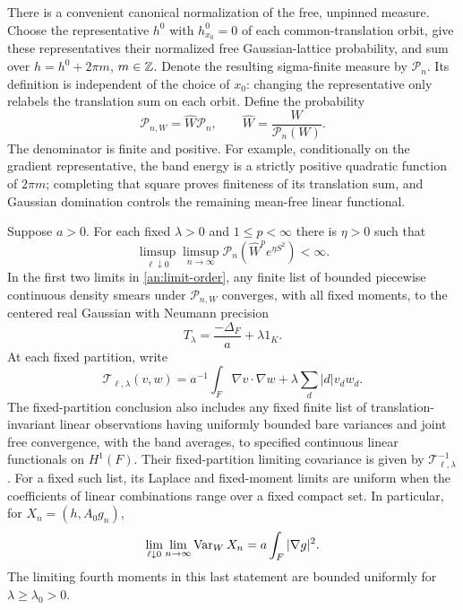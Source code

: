 There is a convenient canonical normalization of the free, unpinned
measure.  Choose the representative $h^0$ with $h^0_{x_0}=0$ of each
common-translation orbit, give these representatives their normalized
free Gaussian-lattice probability, and sum over
$h=h^0+2\pi m$, $m\in\mathbb Z$.  Denote the resulting sigma-finite measure
by $\mathcal P_n$.  Its definition is independent of the choice of
$x_0$: changing the representative only relabels the translation
sum on each orbit.  Define the probability
\begin{equation}
 \mathcal P_{n,W}=\widehat W\mathcal P_n,
 \qquad \widehat W=\frac{W}{\mathcal P_n(W)}.
 \label{an:band-probability}
\end{equation}
The denominator is finite and positive.  For example, conditionally
on the gradient representative, the band energy is a strictly
positive quadratic function of $2\pi m$; completing that square
proves finiteness of its translation sum, and Gaussian domination
controls the remaining mean-free linear functional.

\begin{lemma}\label{an:band-density}
Suppose $a>0$.  For each fixed $\lambda>0$ and $1\le p<\infty$ there is
$\eta>0$ such that
\begin{equation}
 \limsup_{\ell\downarrow0}\limsup_{n\to\infty}
 \mathcal P_n(\widehat W^p e^{\eta S^2})<\infty.
 \label{an:density-moment}
\end{equation}
In the first two limits in \eqref{an:limit-order}, any finite list of
bounded piecewise continuous density smears under $\mathcal P_{n,W}$
converges, with all fixed moments, to the centered real Gaussian with
Neumann precision
\begin{equation}
 T_\lambda=\frac{-\Delta_F}{a}+\lambda 1_K.
 \label{an:band-precision}
\end{equation}
At each fixed partition, write
\[
 \mathcal T_{\ell,\lambda}(v,w)
 =a^{-1}\int_F\nabla v\cdot\nabla w
       +\lambda\sum_d|d|v_dw_d .
\]
The fixed-partition conclusion also includes any fixed finite list of
translation-invariant linear observations having uniformly bounded bare
variances and joint free convergence, with the band averages, to specified
continuous linear functionals on $H^1(F)$.  Their fixed-partition limiting
covariance is given by $\mathcal T_{\ell,\lambda}^{-1}$.  For a fixed such list, its
Laplace and fixed-moment limits are uniform when the coefficients of
linear combinations range over a fixed compact set.
In particular, for $X_n=(h,A_0g_n)$,
\begin{equation}
 \lim_{\ell\downarrow0}\lim_{n\to\infty}\operatorname{Var}_W X_n
       =a\int_F|\nabla g|^2.
 \label{an:band-saturation}
\end{equation}
The limiting fourth moments in this last statement are bounded
uniformly for $\lambda\ge\lambda_0>0$.
\end{lemma}

